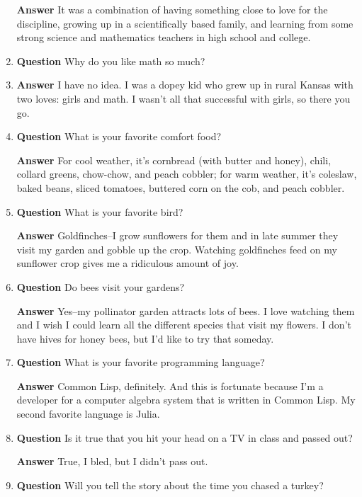 \documentclass[12pt]{article}
\newcounter{ex}\setcounter{ex}{0}
\begin{document}
\begin{enumerate}
\textbf{Answer} It was a combination of having something close to 
love for the discipline, growing up in a scientifically based 
family, and learning from some strong science and mathematics 
teachers in high school and college.


\item \textbf{Question} Why do you like math so much?
\item 
\textbf{Answer} I have no idea. I was  a dopey kid who
grew up in rural Kansas with two loves: girls and math. I wasn't
all that successful with girls, so there you go.

\item  \textbf{Question} What is your favorite comfort food?

  \textbf{Answer}  For cool weather, it's cornbread (with butter and honey), chili, collard greens, chow-chow, and peach cobbler; for warm weather, it's coleslaw, baked beans, sliced tomatoes, buttered corn on the cob, and peach cobbler.

  \item  \textbf{Question}  What is your favorite bird?
  
  \textbf{Answer} Goldfinches--I grow sunflowers for them and in late summer
  they visit my garden and gobble up the crop. Watching goldfinches feed on my 
  sunflower
  crop gives me a 
  ridiculous amount of joy.

  \item  \textbf{Question}  Do bees visit your gardens?
  
  \textbf{Answer} Yes--my pollinator garden attracts lots of bees. I love
  watching them and I wish I could learn all the different
  species that visit my flowers. I don't have hives for honey bees, but
  I'd like to try that someday.

\item   \textbf{Question}  What is your favorite programming language?

 \textbf{Answer}  Common Lisp, definitely. And this is fortunate because I'm a developer for a computer algebra system that is written in Common Lisp. My second favorite language is Julia.

\item   \textbf{Question} Is it true that you hit your head on a TV in class and 
passed out?

  \textbf{Answer} True, I bled, but I didn't pass out.

\item   \textbf{Question} Will you tell the story about the time you chased a turkey?


\end{enumerate}
\end{document}
